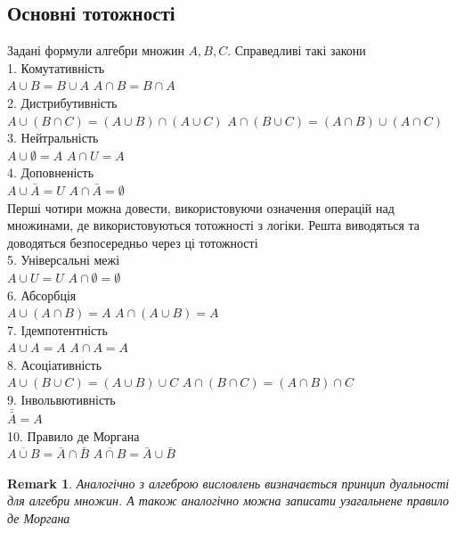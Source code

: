 \documentclass[a4paper, 14pt]{extarticle}
\theoremstyle{theoremdd}
\theoremstyle{theoremdd}
\theoremstyle{theoremdd}
\theoremstyle{theoremdd}
\theoremstyle{theoremdd}
\theoremstyle{theoremdd}
\newtheorem{remark}[theorem]{Remark}
\theoremstyle{theoremdd}
\theoremstyle{theoremdd}
\begin{document}
\subsection{Основні тотожності}
Задані формули алгебри множин $A,B,C$. Справедливі такі закони\\
1. Комутативність\\
$A \cup B = B \cup A$ \hspace{5cm} $A \cap B = B \cap A$\\
2. Дистрибутивність\\
$A \cup (B \cap C) = (A \cup B) \cap (A \cup C)$ \hspace{1cm} $A \cap (B \cup C) = (A \cap B) \cup (A \cap C)$\\
3. Нейтральність\\
$A \cup \emptyset = A$ \hspace{6cm} $A \cap U = A$\\
4. Доповненість\\
$A \cup \bar{A} = U$ \hspace{5.8cm} $A \cap \bar{A} = \emptyset$\\
Перші чотири можна довести, використовуючи означення операцій над множинами, де використовуються тотожності з логіки. Решта виводяться та доводяться безпосередньо через ці тотожності
\bigskip \\
5. Універсальні межі\\
$A \cup U = U$ \hspace{5.8cm} $A \cap \emptyset = \emptyset$\\
6. Абсорбція\\
$A \cup (A \cap B) = A$ \hspace{4.4cm} $A \cap (A \cup B) = A$\\
7. Ідемпотентність\\
$A \cup A = A$ \hspace{5.7cm} $A \cap A = A$\\
8. Асоціативність\\
$A \cup (B \cup C) = (A \cup B) \cup C$ \hspace{2cm} $A \cap (B \cap C) = (A \cap B) \cap C$\\
9. Інвольвютивність\\
$\bar{\bar{A}} = A$\\
10. Правило де Моргана\\
$\overline{A \cup B} = \bar{A} \cap \bar{B}$ \hspace{4.7cm} $\overline{A \cap B} = \bar{A} \cup \bar{B}$

\begin{remark}
Аналогічно з алгеброю висловлень визначається принцип дуальності для алгебри множин. А також аналогічно можна записати узагальнене правило де Моргана
\end{remark}
\end{document}
